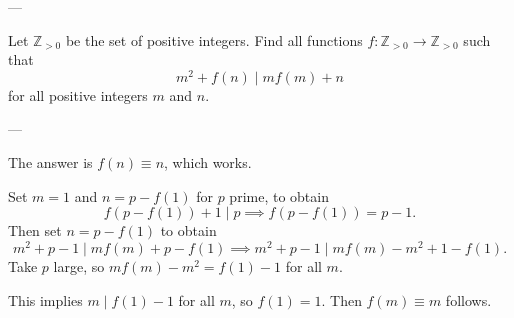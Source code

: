 
---

Let $\mathbb Z_{>0}$ be the set of positive integers. Find all functions $f:\mathbb Z _{>0}\to \mathbb Z_{>0}$ such that
\[m^2+f(n)\mid mf(m)+n \]
for all positive integers $m$ and $n$.

---

The answer is $f(n)\equiv n$, which works.

Set $m=1$ and $n=p-f(1)$ for $p$ prime, to obtain
\[f(p-f(1))+1\mid p\implies f(p-f(1))=p-1.\]
Then set $n=p-f(1)$ to obtain
\[m^2+p-1\mid mf(m)+p-f(1)\implies m^2+p-1\mid mf(m)-m^2+1-f(1).\]
Take $p$ large, so $mf(m)-m^2=f(1)-1$ for all $m$.

This implies $m\mid f(1)-1$ for all $m$, so $f(1)=1$. Then $f(m)\equiv m$ follows.

